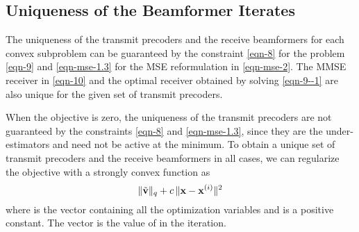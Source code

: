 \subsection{Uniqueness of the Beamformer Iterates}
The uniqueness of the transmit precoders and the receive beamformers for each convex subproblem can be guaranteed by the constraint \eqref{eqn-8} for the problem \eqref{eqn-9} and \eqref{eqn-mse-1.3} for the \ac{MSE} reformulation in \eqref{eqn-mse-2}. The \ac{MMSE} receiver in \eqref{eqn-10} and the optimal receiver obtained by solving \eqref{eqn-9--1} are also unique for the given set of transmit precoders. %

When the objective is zero, the uniqueness of the transmit precoders are not guaranteed by the constraints \eqref{eqn-8} and \eqref{eqn-mse-1.3}, since they are the under-estimators and need not be active at the minimum. To obtain a unique set of transmit precoders and the receive beamformers in all cases, we can regularize the objective with a strongly convex function as
\begin{equation}
\| \tilde{\mathbf{v}} \|_q + c \, \| \mathbf{x} - \mathbf{x}^{(i)} \|^2
\end{equation}
where  is the vector containing all the optimization variables and  is a positive constant. The vector  is the value of  in the  iteration. %

